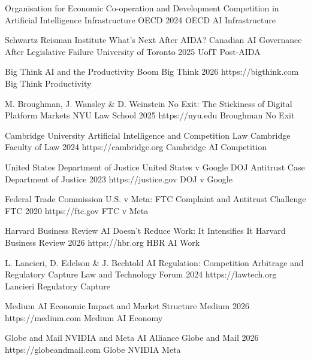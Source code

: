   {Organisation for Economic Co-operation and Development}
  {Competition in Artificial Intelligence Infrastructure}
  {OECD}
  {2024}
  {OECD AI Infrastructure}

  {Schwartz Reisman Institute}
  {What's Next After AIDA? Canadian AI Governance After Legislative Failure}
  {University of Toronto}
  {2025}
  {UofT Post-AIDA}


  {Big Think}
  {AI and the Productivity Boom}
  {Big Think}
  {2026}
  {https://bigthink.com}
  {Big Think Productivity}

  {M. Broughman, J. Wansley \& D. Weinstein}
  {No Exit: The Stickiness of Digital Platform Markets}
  {NYU Law School}
  {2025}
  {https://nyu.edu}
  {Broughman No Exit}

  {Cambridge University}
  {Artificial Intelligence and Competition Law}
  {Cambridge Faculty of Law}
  {2024}
  {https://cambridge.org}
  {Cambridge AI Competition}

  {United States Department of Justice}
  {United States v Google DOJ Antitrust Case}
  {Department of Justice}
  {2023}
  {https://justice.gov}
  {DOJ v Google}

  {Federal Trade Commission}
  {U.S. v Meta: FTC Complaint and Antitrust Challenge}
  {FTC}
  {2020}
  {https://ftc.gov}
  {FTC v Meta}

  {Harvard Business Review}
  {AI Doesn't Reduce Work: It Intensifies It}
  {Harvard Business Review}
  {2026}
  {https://hbr.org}
  {HBR AI Work}

  {L. Lancieri, D. Edelson \& J. Bechtold}
  {AI Regulation: Competition Arbitrage and Regulatory Capture}
  {Law and Technology Forum}
  {2024}
  {https://lawtech.org}
  {Lancieri Regulatory Capture}

  {Medium}
  {AI Economic Impact and Market Structure}
  {Medium}
  {2026}
  {https://medium.com}
  {Medium AI Economy}

  {Globe and Mail}
  {NVIDIA and Meta AI Alliance}
  {Globe and Mail}
  {2026}
  {https://globeandmail.com}
  {Globe NVIDIA Meta}

